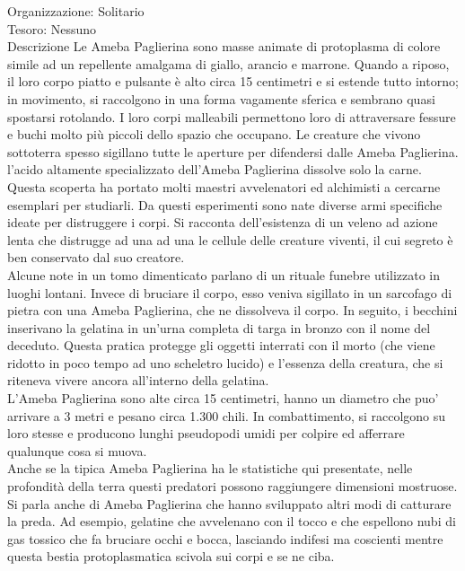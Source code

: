 \begin{multicols}{2}
Organizzazione: Solitario\\
Tesoro: Nessuno\\
Descrizione
Le Ameba Paglierina sono masse animate di protoplasma di colore simile ad un repellente amalgama di giallo, arancio e marrone. Quando a riposo, il loro corpo piatto e pulsante è alto circa 15 centimetri e si estende tutto intorno; in movimento, si raccolgono in una forma vagamente sferica e sembrano quasi spostarsi rotolando. I loro corpi malleabili permettono loro di attraversare fessure e buchi molto più piccoli dello spazio che occupano. Le creature che vivono sottoterra spesso sigillano tutte le aperture per difendersi dalle Ameba Paglierina.\\

l'acido altamente specializzato dell'Ameba Paglierina dissolve solo la carne. Questa scoperta ha portato molti maestri avvelenatori ed alchimisti a cercarne esemplari per studiarli. Da questi esperimenti sono nate diverse armi specifiche ideate per distruggere i corpi. Si racconta dell'esistenza di un veleno ad azione lenta che distrugge ad una ad una le cellule delle creature viventi, il cui segreto è ben conservato dal suo creatore.\\

Alcune note in un tomo dimenticato parlano di un rituale funebre utilizzato in luoghi lontani. Invece di bruciare il corpo, esso veniva sigillato in un sarcofago di pietra con una Ameba Paglierina, che ne dissolveva il corpo. In seguito, i becchini inserivano la gelatina in un'urna completa di targa in bronzo con il nome del deceduto. Questa pratica protegge gli oggetti interrati con il morto (che viene ridotto in poco tempo ad uno scheletro lucido) e l'essenza della creatura, che si riteneva vivere ancora all'interno della gelatina.\\

L'Ameba Paglierina sono alte circa 15 centimetri, hanno un diametro che puo' arrivare a 3 metri e pesano circa 1.300 chili. In combattimento, si raccolgono su loro stesse e producono lunghi pseudopodi umidi per colpire ed afferrare qualunque cosa si muova.\\

Anche se la tipica Ameba Paglierina ha le statistiche qui presentate, nelle profondità della terra questi predatori possono raggiungere dimensioni mostruose. Si parla anche di Ameba Paglierina che hanno sviluppato altri modi di catturare la preda. Ad esempio, gelatine che avvelenano con il tocco e che espellono nubi di gas tossico che fa bruciare occhi e bocca, lasciando indifesi ma coscienti mentre questa bestia protoplasmatica scivola sui corpi e se ne ciba.


\end{multicols}

